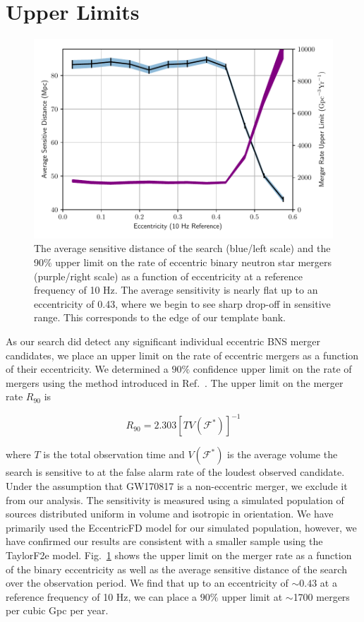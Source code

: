 \section{Upper Limits}

\begin{figure}[t]
  \centering
    \includegraphics[width=\textwidth]{Figures/eccentric-search/rate.pdf}
\caption{The average sensitive distance of the search (blue/left scale) and the 90$\%$ upper limit on the rate of eccentric binary neutron star mergers (purple/right scale) as a function of eccentricity at a reference frequency of 10 Hz. The average sensitivity is nearly flat up to an eccentricity of 0.43, where we begin to see sharp drop-off in sensitive range. This corresponds to the edge of our template bank.
}
\label{fig:range}
\end{figure}

As our search did detect any significant individual eccentric BNS merger candidates, we place an upper limit on the rate of eccentric mergers as a function of their eccentricity. We determined a $90\%$ confidence upper limit on the rate of mergers using the method introduced in Ref.~\cite{Brady:2004gt}. The upper limit on the merger rate $R_{90}$ is

\begin{equation}
    R_{90} = 2.303 \left[TV(\mathcal{F}^*)\right]^{-1}
\end{equation}

where $T$ is the total observation time and $V(\mathcal{F^*})$ is the average volume the search is sensitive to at the false alarm rate of the loudest observed candidate. Under the assumption that GW170817 is a non-eccentric merger, we exclude it from our analysis. The sensitivity is measured using a simulated population of sources distributed uniform in volume and isotropic in orientation. We have primarily used the EccentricFD model for our simulated population, however, we have confirmed our results are consistent with a smaller sample using the TaylorF2e model. Fig.~\ref{fig:range} shows the upper limit on the merger rate as a function of the binary eccentricity as well as the average sensitive distance of the search over the observation period. We find that up to an eccentricity of $\sim 0.43$ at a reference frequency of 10 Hz, we can place a $90\%$ upper limit at $\sim$1700 mergers per cubic Gpc per year.

